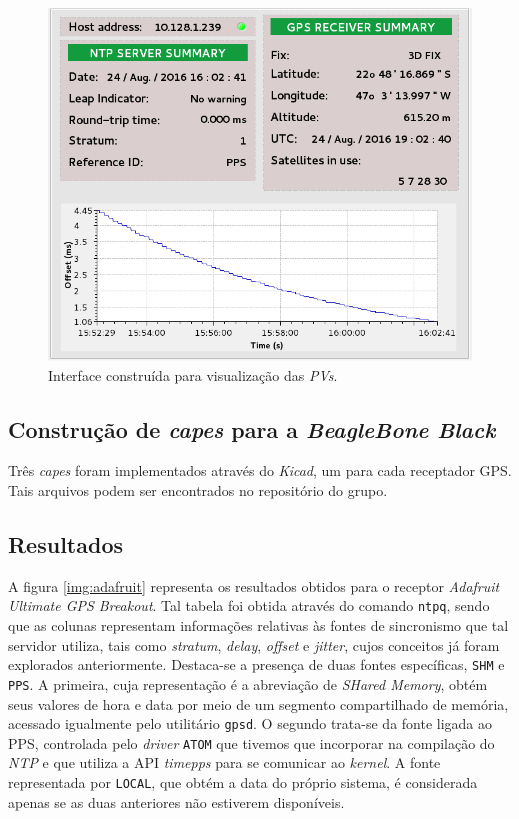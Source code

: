 \begin{figure}[h]
    
    \centering
    \includegraphics[scale=0.35]{image/epics-opi-ntpgps}
    \caption {Interface construída para visualização das
    \textit{PVs}.}
    \label{img:ntp-opi} 
\end{figure} 

 
\subsection{Construção de \textit{capes} para a \textit{BeagleBone Black}}

Três \textit{capes} foram implementados através do \textit{Kicad}, um para cada
receptador GPS. Tais arquivos podem ser encontrados no repositório do grupo.

\subsection{Resultados}

A figura \ref{img:adafruit} representa os resultados obtidos para o receptor
\textit{Adafruit Ultimate GPS Breakout}. Tal tabela foi obtida através do
comando \texttt{ntpq}, sendo que as colunas representam informações relativas às fontes de sincronismo que
tal servidor utiliza, tais como \textit{stratum}, \textit{delay},
\textit{offset} e \textit{jitter}, cujos conceitos já foram explorados
anteriormente. Destaca-se a presença de duas fontes específicas, \texttt{SHM} e
\texttt{PPS}. A primeira, cuja representação é a abreviação de \textit{SHared
Memory}, obtém seus valores de hora e data por meio de um segmento compartilhado de memória,
acessado igualmente pelo utilitário \texttt{gpsd}. O segundo trata-se da fonte
ligada ao PPS, controlada pelo \textit{driver} \texttt{ATOM} que tivemos que
incorporar na compilação do \textit{NTP} e que utiliza a API \textit{timepps}
para se comunicar ao \textit{kernel}. A fonte representada por \texttt{LOCAL},
que obtém a data do próprio sistema, é considerada apenas se as duas anteriores
não estiverem disponíveis.

